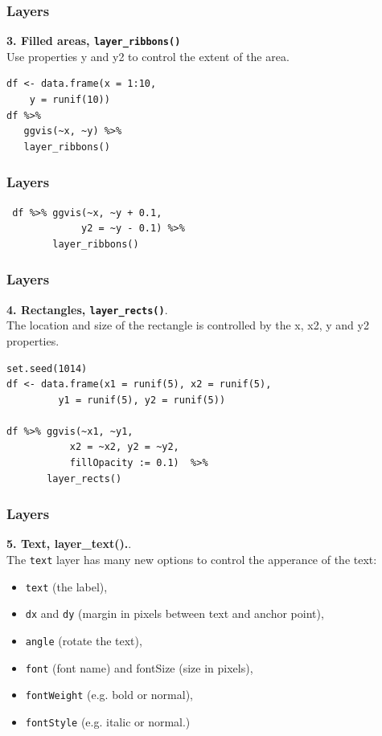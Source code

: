 \documentclass[MASTER.tex]{subfiles}
\begin{document}
\begin{frame}[fragile]
	\frametitle{Layers}
	\Large
\textbf{3. Filled areas, \texttt{layer\_ribbons()}}\\ Use properties y and y2 to control the extent of the area.

\begin{framed}
	\begin{verbatim}
df <- data.frame(x = 1:10, 
    y = runif(10))
df %>% 
   ggvis(~x, ~y) %>% 
   layer_ribbons()
\end{verbatim}
\end{framed}

\end{frame}
\begin{frame}[fragile]
	\frametitle{Layers}
\Large
\vspace{-1.4cm}
\begin{framed}
	\begin{verbatim}
 df %>% ggvis(~x, ~y + 0.1, 
             y2 = ~y - 0.1) %>% 
        layer_ribbons()
\end{verbatim}
\end{framed}
\end{frame}
\begin{frame}[fragile]
	\frametitle{Layers}
\textbf{4. Rectangles, \texttt{layer\_rects()}}.\\ The location and size of the rectangle is controlled by the x, x2, y and y2 properties.

	\begin{framed}
		\begin{verbatim}
set.seed(1014)
df <- data.frame(x1 = runif(5), x2 = runif(5), 
         y1 = runif(5), y2 = runif(5))

df %>% ggvis(~x1, ~y1, 
           x2 = ~x2, y2 = ~y2, 
           fillOpacity := 0.1)  %>% 
       layer_rects()
\end{verbatim}
\end{framed}
\end{frame}

\begin{frame}[fragile]
	\frametitle{Layers}
\textbf{5. Text, layer\_text().}.\\	
The \texttt{text} layer has many new options to control the apperance of the text: \begin{itemize}
\item \texttt{text} (the label), 
\item \texttt{dx} and \texttt{dy} (margin in pixels between text and anchor point), 
\item \texttt{angle} (rotate the text), 
\item \texttt{font} (font name) and fontSize (size in pixels),
\item \texttt{fontWeight} (e.g. bold or normal), 
\item \texttt{fontStyle} (e.g. italic or normal.)
\end{itemize}
\end{frame}
\end{document}
